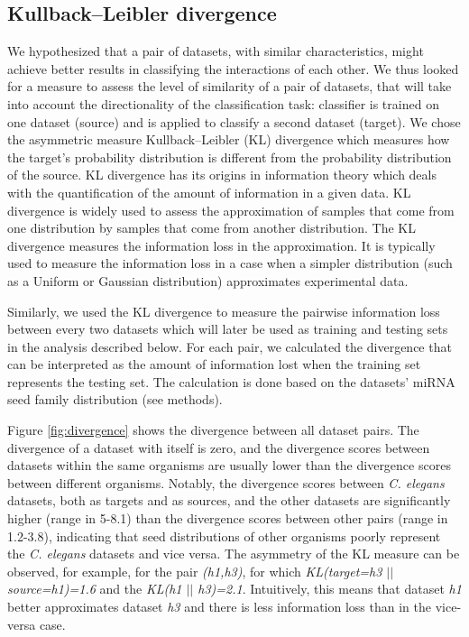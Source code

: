 \subsection{Kullback–Leibler divergence}
We hypothesized that a pair of datasets, with similar characteristics, might achieve better results in classifying the interactions of each other. We thus looked for a measure to assess the level of similarity of a pair of datasets, that will take into account the directionality of the classification task: classifier is trained on one dataset (source) and is applied to classify a second dataset (target).
We chose the asymmetric measure Kullback–Leibler (KL) divergence which measures how the target's probability distribution is different from the probability distribution of the source. KL divergence has its origins in information theory which deals with the quantification of the amount of information in a given data. KL divergence is widely used to assess the approximation of samples that come from one distribution by samples that come from another distribution. The KL divergence measures the information loss in the approximation. It is typically used to measure the information loss in a case when a simpler distribution (such as a Uniform or Gaussian distribution) approximates experimental data.

Similarly, we used the KL divergence to measure the pairwise information loss between every two datasets which will later be used as training and testing sets in the analysis described below. For each pair, we calculated the divergence that can be interpreted as the amount of information lost when the training set represents the testing set. The calculation is done based on the datasets' miRNA seed family distribution (see methods).

Figure \ref{fig:divergence} shows the divergence between all dataset pairs. The divergence of a dataset with itself is zero, and the divergence scores between datasets within the same organisms are usually lower than the divergence scores between different organisms. Notably, the divergence scores between \textit{C. elegans} datasets, both as targets and as sources, and the other datasets are significantly higher (range in 5-8.1) than the divergence scores between other pairs (range in 1.2-3.8), indicating that seed distributions of other organisms poorly represent the \textit{C. elegans} datasets and vice versa. The asymmetry of the KL measure can be observed, for example, for the pair \textit{(h1,h3)}, for which \textit{KL(target=h3 $||$ source=h1)=1.6} and the  \textit{KL(h1 $||$ h3)=2.1}. Intuitively, this means that dataset \textit{h1} better approximates dataset \textit{h3} and there is less information loss than in the vice-versa case.


